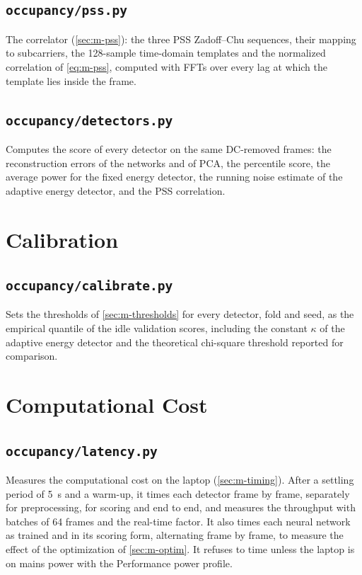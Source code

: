 \begin{singlespace}
\subsection*{\texttt{occupancy/pss.py}}
The \syncsignal{} correlator (\cref{sec:m-pss}): the three PSS Zadoff--Chu sequences, their mapping to subcarriers, the 128-sample time-domain templates and the normalized correlation of \cref{eq:m-pss}, computed with FFTs over every lag at which the template lies inside the frame.


\subsection*{\texttt{occupancy/detectors.py}}
Computes the score of every detector on the same DC-removed frames: the reconstruction errors of the networks and of PCA, the percentile score, the average power for the fixed energy detector, the running noise estimate of the adaptive energy detector, and the PSS correlation.


\section{Calibration}
\label{app:code-eval}

\subsection*{\texttt{occupancy/calibrate.py}}
Sets the thresholds of \cref{sec:m-thresholds} for every detector, fold and seed, as the empirical quantile of the idle validation scores, including the constant $\kappa$ of the adaptive energy detector and the theoretical chi-square threshold reported for comparison.


\section{Computational Cost}
\label{app:code-cost}

\subsection*{\texttt{occupancy/latency.py}}
Measures the computational cost on the laptop (\cref{sec:m-timing}). After a settling period of \qty{5}{\second} and a warm-up, it times each detector frame by frame, separately for preprocessing, for scoring and end to end, and measures the throughput with batches of 64 frames and the real-time factor. It also times each neural network as trained and in its scoring form, alternating frame by frame, to measure the effect of the optimization of \cref{sec:m-optim}. It refuses to time unless the laptop is on mains power with the Performance power profile.



\end{singlespace}
